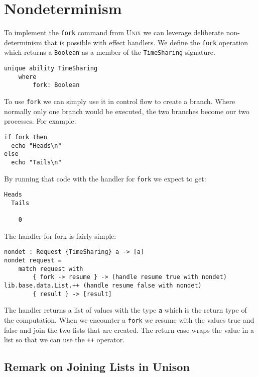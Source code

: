 \documentclass[logo,bsc,singlespacing,parskip]{infthesis}
\begin{document}
\section{Nondeterminism}

To implement the \texttt{fork} command from \textsc{Unix} we can leverage
deliberate non-determinism that is possible with effect handlers. We define the
\texttt{fork} operation which returns a \texttt{Boolean} as a member of the
\texttt{TimeSharing} signature.

\begin{lstlisting}[language=unison]
unique ability TimeSharing
    where
        fork: Boolean
\end{lstlisting}

To use \texttt{fork} we can simply use it in control flow to create a branch.
Where normally only one branch would be executed, the two branches become our
two processes. For example:

\begin{lstlisting}[language=unison]
if fork then 
  echo "Heads\n"
else 
  echo "Tails\n"
\end{lstlisting}

By running that code with the handler for \texttt{fork} we expect to get:

\begin{lstlisting}[style=terminal]
  Heads
  Tails
    
    0
\end{lstlisting}

The handler for fork is fairly simple:

\begin{lstlisting}[language=unison]
nondet : Request {TimeSharing} a -> [a]
nondet request =
    match request with
        { fork -> resume } -> (handle resume true with nondet) lib.base.data.List.++ (handle resume false with nondet)
        { result } -> [result]
\end{lstlisting}

The handler returns a list of values with the type \texttt{a} which is the
return type of the computation. When we encounter a \texttt{fork} we resume
with the values true and false and join the two lists that are created. The
return case wraps the value in a list so that we can use the \texttt{++}
operator.

\subsection{Remark on Joining Lists in Unison}
\label{sec:remarklists}
\end{document}
